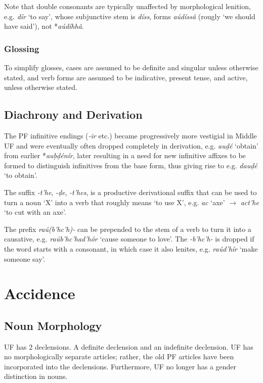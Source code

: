 \documentclass[a4paper, 12pt, twoside, final]{article}
\let \w \textit
\begin{document}
\noindent Note that double consonants are typically unaffected by morphological lenition, e.g. \w{dír} ‘to say’,
whose subjunctive stem is \w{díss}, forms \w{aúdíssâ} (rougly ‘we should have said’), not *\w{aúdíhhâ}.

\subsubsection{Glossing}
To simplify glosses, cases are assumed to be definite and singular unless otherwise stated, and verb forms are
assumed to be indicative, present tense, and active, unless otherwise stated.

\subsection{Diachrony and Derivation}\label{subsec:diachrony-and-derivation}
The PF infinitive endings (\w{-ir} etc.) became progressively more vestigial in Middle UF and were eventually
often dropped completely in derivation, e.g. \w{auḍé} ‘obtain’ from earlier *\w{auḅḍénír}, later resulting in
a need for new infinitive affixes to be formed to distinguish infinitives from the base form, thus giving
rise to e.g. \w{dauḍé} ‘to obtain’.

The suffix \w{-t’he},  \w{-ḍe},  \w{-t’hes}, is a productive derivational suffix that can be used to turn a
noun ‘X’ into a verb that roughly means ‘to use X’, e.g. \w{ac} ‘axe’ $\to$ \w{act’he} ‘to cut with an axe’.

The prefix \w{raú(b’hc’h)-} can be prepended to the stem of a verb to turn it into a causative, e.g. \w{raúb’hc’had’hór}
‘cause someone to love’. The \w{-b’hc’h-} is dropped if the word starts with a consonant, in which case it also
lenites, e.g. \w{raúd’hír} ‘make someone say’.

\section{Accidence}\label{sec:accidence}

\subsection{Noun Morphology}\label{subsec:noun-morphology}
UF has 2 declensions. A definite declension and an indefinite declension.
UF has no morphologically separate articles; rather, the old PF articles have been incorporated
into the declensions. Furthermore, UF no longer has a gender distinction in nouns.
\end{document}

